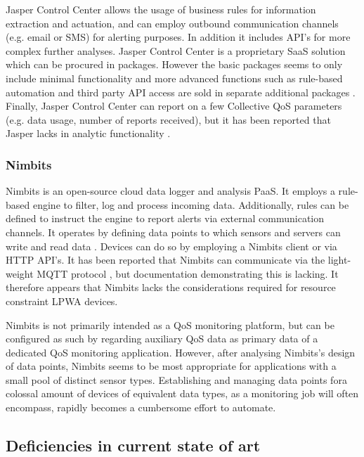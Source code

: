 Jasper Control Center allows the usage of business rules for information extraction and actuation, and can employ outbound communication channels (e.g. email or SMS) for alerting purposes.  In addition it includes API's for more complex further analyses. Jasper Control Center is a proprietary SaaS solution which can be procured in packages. However the basic packages seems to only include minimal functionality and more advanced functions such as rule-based automation and third party API access are sold in separate additional packages \cite{cisco_jasper}. Finally, Jasper Control Center can report on a few Collective QoS parameters (e.g. data usage, number of reports received), but it has been reported that Jasper lacks in analytic functionality \cite{forrester}.

\subsubsection*{Nimbits}
Nimbits \cite{web:nimbits} is an open-source cloud data logger and analysis PaaS. It employs a rule-based engine to filter, log and process incoming data. Additionally, rules can be defined to instruct the engine to report alerts via external communication channels. It operates by defining data points to which sensors and servers can write and read data \cite{study_of_various, nimbits_mqtt}. Devices can do so by employing a Nimbits client or via HTTP API's. It has been reported that Nimbits can communicate via the light-weight MQTT protocol \cite{nimbits_mqtt}, but documentation demonstrating this is lacking. It therefore appears that Nimbits lacks the considerations required for resource constraint LPWA devices.

Nimbits is not primarily intended as a QoS monitoring platform, but can be configured as such by regarding auxiliary QoS data as primary data of a dedicated QoS monitoring application. However, after analysing Nimbits's design of data points, Nimbits seems to be most appropriate for applications with a small pool of distinct sensor types. Establishing and managing data points fora colossal amount of devices of equivalent data types, as a monitoring job will often encompass, rapidly becomes a cumbersome effort to automate.

\subsection{Deficiencies in current state of art}
